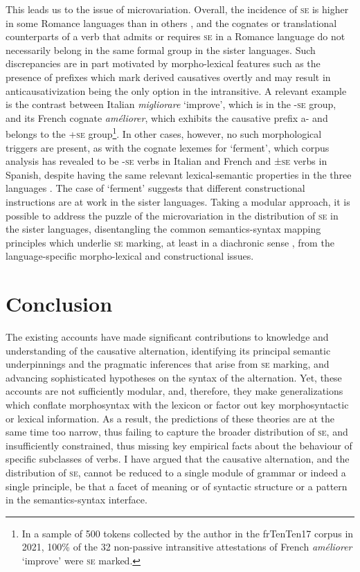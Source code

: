 \documentclass[output=paper,colorlinks,citecolor=brown
]{langscibook}
\begin{document}
This leads us to the issue of microvariation. Overall, the incidence of \textsc{se} is higher in some Romance languages than in others \citep{heidinger2015causalness}, and the cognates or translational counterparts of a verb that admits or requires \textsc{se} in a Romance language do not necessarily belong in the same formal group in the sister languages. Such discrepancies are in part motivated by morpho-lexical features such as the presence of prefixes which mark derived causatives overtly and may result in anticausativization being the only option in the intransitive. A relevant example is the contrast between Italian \textit{migliorare} ‘improve’, which is in the \mbox{-\textsc{se}} group, and its French cognate \textit{améliorer}, which exhibits the causative prefix \mbox{a-} and belongs to the +\textsc{se} group\footnote{In a sample of 500 tokens collected by the author in the frTenTen17 corpus \citep{jakubicek2013tenten} in 2021, 100\% of the 32 non-passive intransitive attestations of French \textit{améliorer} ‘improve’ were \textsc{se} marked.}.  In other cases, however, no such morphological triggers are present, as with the cognate lexemes for ‘ferment’, which corpus analysis has revealed to be -\textsc{se} verbs in Italian and French and ±\textsc{se} verbs in Spanish, despite having the same relevant lexical-semantic properties in the three languages \citep{bentley2023internally}. The case of ‘ferment’ suggests that different constructional instructions are at work in the sister languages. Taking a modular approach, it is possible to address the puzzle of the microvariation in the distribution of \textsc{se} in the sister languages, disentangling the common semantics-syntax mapping principles which underlie \textsc{se} marking, at least in a diachronic sense \citep{cennamo1995patterns}, from the language-specific morpho-lexical and constructional issues. 

\section{Conclusion}
\label{bentley_section_6}
The existing accounts have made significant contributions to knowledge and understanding of the causative alternation, identifying its principal semantic underpinnings and the pragmatic inferences that arise from \textsc{se} marking, and advancing sophisticated hypotheses on the syntax of the alternation. Yet, these accounts are not sufficiently modular, and, therefore, they make generalizations which conflate morphosyntax with the lexicon or factor out key morphosyntactic or lexical information.  As a result, the predictions of these theories are at the same time too narrow, thus failing to capture the broader distribution of \textsc{se}, and insufficiently constrained, thus missing key empirical facts about the behaviour of specific subclasses of verbs. I have argued that the causative alternation, and the distribution of \textsc{se}, cannot be reduced to a single module of grammar or indeed a single principle, be that a facet of meaning or of syntactic structure or a pattern in the semantics-syntax interface. 
\end{document}
